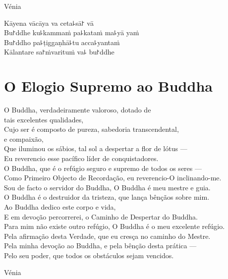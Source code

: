 \begin{instruction}
  Vénia
\end{instruction}

Kāyena vācāya va ceta꜕sā꜓ vā\\
Bu꜓ddhe ku꜕kammaṁ pa꜕kataṁ ma꜕yā yaṁ\\
Bu꜓ddho pa꜕ṭiggaṇhā꜕tu acca꜕yantaṁ\\
Kālantare sa꜓ṁvarituṁ va꜕ bu꜓ddhe

\clearpage

\chapter{O Elogio Supremo ao Buddha}

\begin{leader}
\end{leader}

O Buddha, verdadeiramente valoroso, dotado de\\
\vin tais excelentes qualidades,\\
Cujo ser é composto de pureza, sabedoria transcendental,\\
\vin e compaixão,\\
Que iluminou os sábios, tal sol a despertar a flor de lótus ---\\
Eu reverencio esse pacífico líder de conquistadores.\\
O Buddha, que é o refúgio seguro e supremo de todos os seres ---\\
Como Primeiro Objecto de Recordação, eu reverencio-O inclinando-me.\\
Sou de facto o servidor do Buddha, O Buddha é meu mestre e guia.\\
O Buddha é o destruidor da tristeza, que lança bênçãos sobre mim.\\
Ao Buddha dedico este corpo e vida,\\
E em devoção percorrerei, o Caminho de Despertar do Buddha.\\
Para mim não existe outro refúgio, O Buddha é o meu excelente refúgio.\\
Pela afirmação desta Verdade, que eu cresça no caminho do Mestre.\\
Pela minha devoção ao Buddha, e pela bênção desta prática ---\\
Pelo seu poder, que todos os obstáculos sejam vencidos.

\begin{instruction}
  Vénia
\end{instruction}

